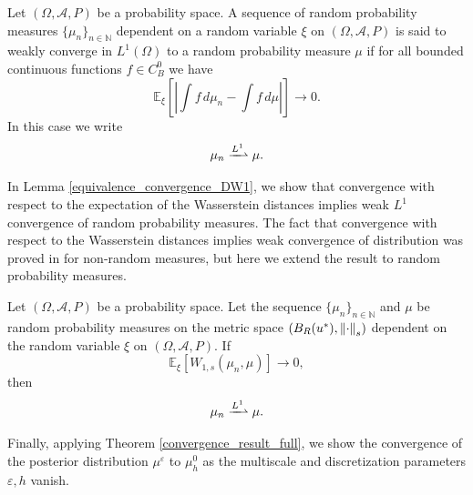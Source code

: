 \documentclass[10pt]{article}
\begin{document}
\begin{definition}
\label{weak_convergence_L1_distribution}
Let $(\Omega, \mathcal{A}, P)$ be a probability space. A sequence of random probability measures $\{ \mu_n \}_{n \in \mathbb{N}}$ dependent on a random variable $\xi$ on $(\Omega, \mathcal{A}, P)$ is said to weakly converge in $L^1(\Omega)$ to a random probability measure $\mu$ if for all bounded continuous functions $f \in C^0_B$ we have
\[ \mathbb{E}_{\xi} \left [ \left |\int f \, d \mu_n - \int f \, d \mu  \right | \right ] \to 0. \]
In this case we write
\[ \mu_n \xrightharpoonup{L^1} \mu. \]
\end{definition}

In Lemma \ref{equivalence_convergence_DW1},  we show that convergence with respect to the expectation of the Wasserstein distances implies weak $L^1$ convergence of random probability measures. The fact that convergence with respect to the Wasserstein distances implies weak convergence of distribution was proved in \cite{San15} for non-random measures, but here we extend the result to random probability measures.

\begin{lemma}
\label{equivalence_convergence_DW1}
Let $(\Omega, \mathcal{A}, P)$ be a probability space. Let the sequence $\{ \mu_n \}_{n \in \mathbb{N}}$ and $\mu$ be random probability measures on the metric space $(B_R(u^*), \left\|\cdot\right\|_s)$ dependent on the random variable $\xi$ on $(\Omega, \mathcal{A}, P)$. If
\[ \mathbb{E}_{\xi} [W_{1,s}(\mu_n, \mu)] \to 0, \]
then
\[ \mu_n \xrightharpoonup{L^1} \mu. \]
\end{lemma}

Finally, applying Theorem \ref{convergence_result_full}, we show the convergence of the posterior distribution $\mu^{\varepsilon}$ to $\mu_h^0$ as the multiscale and discretization parameters $\varepsilon, h$ vanish.
\end{document}
